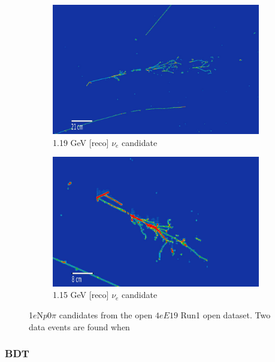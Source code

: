 \documentclass[a4paper]{article}
\newcommand{\npsel}{1$e$N$p$0$\pi$ }
\begin{document}
\begin{figure}[H] 
\begin{center}
    \begin{subfigure}[b]{0.45\textwidth}
    \centering
    \includegraphics[width=1.00\textwidth]{1eNp/1eNp_box_evd1.png}
    \caption{\label{fig:1eNp:box:evd1}1.19 GeV [reco] $\nu_e$ candidate}
    \end{subfigure}
    \begin{subfigure}[b]{0.45\textwidth}
    \centering
    \includegraphics[width=1.00\textwidth]{1eNp/1eNp_box_evd2.png}
    \caption{\label{fig:1eNp:box:evd2}1.15 GeV [reco] $\nu_e$ candidate}
    \end{subfigure}
\caption{\label{ffig:1eNp:box:evd} \npsel candidates from the open $4eE19$ Run1 open dataset. Two data events are found when }
\end{center}
\end{figure}

\subsubsection{BDT}
\end{document}
